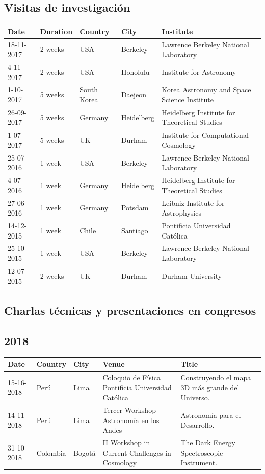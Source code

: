 \documentclass{article}
\begin{document}
\subsection{Visitas de investigaci\'on}
\begin{tabular}{p{1.7cm} p{1.3cm} p{2.0cm} p{1.5cm} p{7.0cm}}\hline
Date & Duration & Country & City & Institute\\\hline
18-11-2017 & 2 weeks & USA & Berkeley & Lawrence Berkeley National Laboratory\\
4-11-2017 & 2 weeks & USA & Honolulu & Institute for Astronomy\\
1-10-2017 & 5 weeks & South Korea & Daejeon & Korea Astronomy and Space Science Institute \\
26-09-2017 & 5 weeks & Germany & Heidelberg & Heidelberg Institute for Theoretical Studies\\
1-07-2017 & 5 weeks & UK & Durham & Institute for Computational Cosmology\\
25-07-2016 & 1 week & USA & Berkeley & Lawrence Berkeley National Laboratory\\
4-07-2016 & 1 week & Germany & Heidelberg & Heidelberg Institute for Theoretical Studies \\
27-06-2016 & 1 week & Germany & Potsdam & Leibniz Institute for Astrophysics \\
14-12-2015 & 1 week & Chile & Santiago & Pontificia Universidad Cat\'olica\\
25-10-2015 & 1 week & USA & Berkeley & Lawrence Berkeley National Laboratory\\
12-07-2015 & 2 weeks & UK & Durham & Durham University\\\hline
\end{tabular}

\subsection{Charlas t\'ecnicas y presentaciones en congresos}


\subsection*{2018}
\noindent
\begin{tabular}{p{2.0cm} p{1.5cm} p{1.5cm} p{4.5cm} p{6.0cm}}\hline
Date & Country & City& Venue & Title\\\hline
15-16-2018 & Per\'u & Lima & Coloquio de F\'isica Pontificia Universidad Cat\'olica & Construyendo el mapa 3D m\'as grande del Universo. \\
14-11-2018 & Per\'u & Lima & Tercer Workshop Astronom\'ia en los Andes & Astronom\'ia para el Desarrollo. \\
31-10-2018 & Colombia & Bogot\'a & II Workshop in Current Challenges in Cosmology & The Dark Energy Spectroscopic Instrument. \\
\end{tabular}
\end{document}
